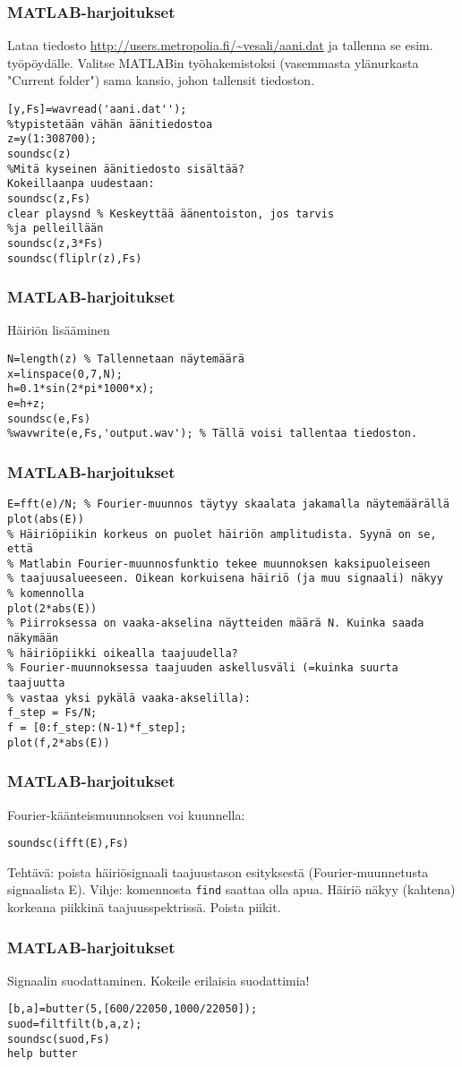 \begin{frame}[fragile]
\frametitle{MATLAB-harjoitukset}
\small Lataa tiedosto \url{http://users.metropolia.fi/~vesali/aani.dat} ja tallenna se esim. työpöydälle.
Valitse MATLABin työhakemistoksi (vasemmasta ylänurkasta "Current folder") sama kansio, johon
tallensit tiedoston.
\begin{verbatim}
[y,Fs]=wavread('aani.dat'');
%typistetään vähän äänitiedostoa
z=y(1:308700);
soundsc(z)
%Mitä kyseinen äänitiedosto sisältää?
Kokeillaanpa uudestaan:
soundsc(z,Fs)
clear playsnd % Keskeyttää äänentoiston, jos tarvis
%ja pelleillään
soundsc(z,3*Fs)
soundsc(fliplr(z),Fs)
\end{verbatim}
\end{frame}




\begin{frame}[fragile]
\frametitle{MATLAB-harjoitukset}
Häiriön lisääminen
\small
\begin{verbatim}
N=length(z) % Tallennetaan näytemäärä
x=linspace(0,7,N);
h=0.1*sin(2*pi*1000*x);
e=h+z;
soundsc(e,Fs)
%wavwrite(e,Fs,'output.wav'); % Tällä voisi tallentaa tiedoston.
\end{verbatim}
\end{frame}

\begin{frame}[fragile]
\frametitle{MATLAB-harjoitukset}
\small
\begin{verbatim}
E=fft(e)/N; % Fourier-muunnos täytyy skaalata jakamalla näytemäärällä
plot(abs(E))
% Häiriöpiikin korkeus on puolet häiriön amplitudista. Syynä on se, että
% Matlabin Fourier-muunnosfunktio tekee muunnoksen kaksipuoleiseen
% taajuusalueeseen. Oikean korkuisena häiriö (ja muu signaali) näkyy
% komennolla
plot(2*abs(E))
% Piirroksessa on vaaka-akselina näytteiden määrä N. Kuinka saada näkymään
% häiriöpiikki oikealla taajuudella?
% Fourier-muunnoksessa taajuuden askellusväli (=kuinka suurta taajuutta
% vastaa yksi pykälä vaaka-akselilla):
f_step = Fs/N;
f = [0:f_step:(N-1)*f_step];
plot(f,2*abs(E))
\end{verbatim}
\end{frame}

\begin{frame}[fragile]
\frametitle{MATLAB-harjoitukset}
Fourier-käänteismuunnoksen voi kuunnella:
\small
\begin{verbatim}
soundsc(ifft(E),Fs)
\end{verbatim}
Tehtävä: poista häiriösignaali taajuustason esityksestä (Fourier-muunnetusta signaalista E). Vihje: komennosta \verb+find+
saattaa olla apua. Häiriö näkyy (kahtena) korkeana piikkinä taajuusspektrissä. Poista piikit.
\end{frame}


\begin{frame}[fragile]
\frametitle{MATLAB-harjoitukset}
Signaalin suodattaminen. Kokeile erilaisia suodattimia!
\small
\begin{verbatim}
[b,a]=butter(5,[600/22050,1000/22050]);
suod=filtfilt(b,a,z);
soundsc(suod,Fs)
help butter
\end{verbatim}
\end{frame}
